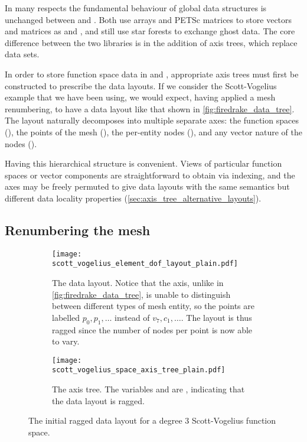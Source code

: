 \documentclass[thesis]{subfiles}
\begin{document}
In many respects the fundamental behaviour of global data structures is unchanged between  and .
Both use \numpy{} arrays and PETSc matrices to store vectors and matrices as  and , and  still use star forests to exchange ghost data.
The core difference between the two libraries is in the addition of axis trees, which replace  data sets.

In order to store function space data in   and , appropriate axis trees must first be constructed to prescribe the data layouts.
If we consider the Scott-Vogelius example that we have been using, we would expect, having applied a mesh renumbering, to have a data layout like that shown in \cref{fig:firedrake_data_tree}.
The layout naturally decomposes into multiple separate axes: the function spaces (), the points of the mesh (), the per-entity nodes (), and any vector nature of the nodes ().

Having this hierarchical structure is convenient.
Views of particular function spaces or vector components are straightforward to obtain via indexing, and the axes may be freely permuted to give data layouts with the same semantics but different data locality properties (\cref{sec:axis_tree_alternative_layouts}).

\subsection{Renumbering the mesh}
\label{sec:firedrake_renumbering_mesh}

\begin{figure}
  \centering
  \begin{subfigure}{\textwidth}
    \centering
    \texttt{[image: scott\_vogelius\_element\_dof\_layout\_plain.pdf]}
    \caption{
      The data layout.
      Notice that the  axis, unlike in \cref{fig:firedrake_data_tree}, is unable to distinguish between different types of mesh entity, so the points are labelled $p_0, p_1, \dots$ instead of $v_7, c_1, \dots$.
      The layout is thus ragged since the number of nodes per point is now able to vary.
    }
    \label{fig:firedrake_data_tree_plain}
  \end{subfigure}

  \vspace{1em}

  \begin{subfigure}{\textwidth}
    \centering
    \texttt{[image: scott\_vogelius\_space\_axis\_tree\_plain.pdf]}
    \caption{
      The axis tree.
      The variables  and  are  , indicating that the data layout is ragged.
    }
    \label{fig:firedrake_axis_tree_plain}
  \end{subfigure}
  \caption{
    The initial ragged data layout for a degree 3 Scott-Vogelius function space.
  }
  \label{fig:firedrake_plain}
\end{figure}
\end{document}
